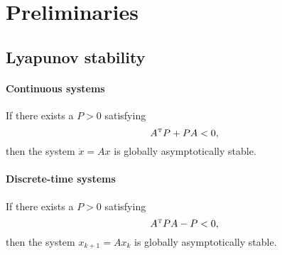 \section{Preliminaries}


\subsection{Lyapunov stability}

\paragraph{Continuous systems}
If there exists a $P > 0$ satisfying
\begin{equation}
  A\tp P + PA < 0,
\end{equation}
then the system $\dot{x} = Ax$ is globally asymptotically stable.

\paragraph{Discrete-time systems}
If there exists a $P > 0$ satisfying
\begin{equation}
  A\tp P A - P < 0,
\end{equation}
then the system $x_{k+1} = Ax_k$ is globally asymptotically stable.
